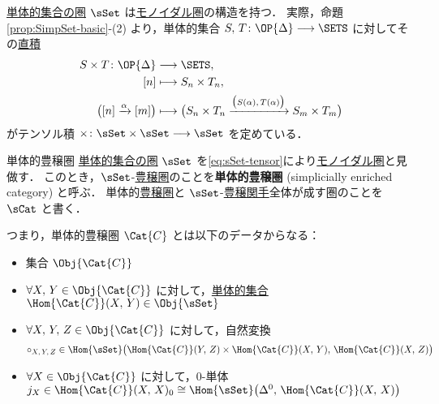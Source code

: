 \documentclass[TQFT_main]{subfiles}
\begin{document}
\hyperref[def:SimpSet]{単体的集合の圏} $\sSet$ は\hyperref[def:monoidal-category]{モノイダル圏}の構造を持つ．
実際，命題\ref{prop:SimpSet-basic}-(2) より，単体的集合 $S,\, T \colon \OP{\Delta} \lto \SETS$ に対してその\hyperref[def:product-coproduct]{直積}
\begin{align}
    \label{eq:sSet-tensor}
    S \times T \colon \OP{\Delta} &\lto \SETS,\\ 
    [n] &\lmto S_n \times T_n, \\
    \bigl( [n] \xrightarrow{\alpha} [m] \bigr) &\lmto \bigl( S_n \times T_n \xrightarrow{\bigl(S(\alpha),\, T(\alpha)\bigr)} S_{m} \times T_{m} \bigr) 
\end{align}
がテンソル積 $\times \colon \sSet \times \sSet \lto \sSet$ を定めている．

\begin{mydef}[label=def:SimpCat]{単体的豊穣圏}
    \hyperref[def:SimpSet]{単体的集合の圏} $\sSet$ を\eqref{eq:sSet-tensor}により\hyperref[redef:monoidal-category]{モノイダル圏}と見做す．
    このとき，$\sSet$-\hyperref[def:enriched]{豊穣圏}のことを\textbf{単体的豊穣圏} (simplicially enriched category) と呼ぶ．
    \tcblower
    単体的\hyperref[def:enriched]{豊穣圏}と $\sSet$-\hyperref[def:enriched-functor]{豊穣関手}全体が成す圏のことを $\sCat$ と書く．
\end{mydef}

つまり，単体的豊穣圏 $\Cat{C}$ とは以下のデータからなる：
\begin{itemize}
    \item 集合 $\Obj{\Cat{C}}$
    \item $\forall X,\, Y \in \Obj{\Cat{C}}$ に対して，\hyperref[def:SimpSet]{単体的集合} $\Hom{\Cat{C}}(X,\, Y) \in \Obj{\sSet}$
    \item $\forall X,\, Y,\, Z \in \Obj{\Cat{C}}$ に対して，自然変換
    \begin{align}
        \circ_{X,\, Y,\, Z} \in \Hom{\sSet} \bigl( \Hom{\Cat{C}}(Y,\, Z) \times \Hom{\Cat{C}}(X,\, Y),\, \Hom{\Cat{C}}(X,\, Z) \bigr) 
    \end{align}
    \item $\forall X \in \Obj{\Cat{C}}$ に対して，$0$-単体 $j_X \in \Hom{\Cat{C}}(X,\, X)_0 \cong \Hom{\sSet} \bigl( \Delta^0,\, \Hom{\Cat{C}}(X,\, X) \bigr)$
\end{itemize}
\end{document}

